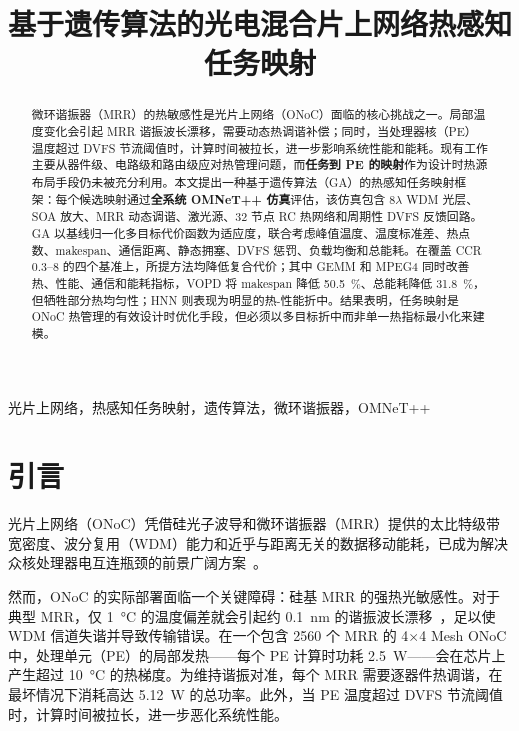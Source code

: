 \documentclass[conference]{IEEEtran}
\begin{document}
\title{基于遗传算法的光电混合片上网络热感知任务映射}

\author{
}

\maketitle

\begin{abstract}
微环谐振器（MRR）的热敏感性是光片上网络（ONoC）面临的核心挑战之一。局部温度变化会引起 MRR 谐振波长漂移，需要动态热调谐补偿；同时，当处理器核（PE）温度超过 DVFS 节流阈值时，计算时间被拉长，进一步影响系统性能和能耗。现有工作主要从器件级、电路级和路由级应对热管理问题，而\textbf{任务到 PE 的映射}作为设计时热源布局手段仍未被充分利用。本文提出一种基于遗传算法（GA）的热感知任务映射框架：每个候选映射通过\textbf{全系统 OMNeT++ 仿真}评估，该仿真包含 8$\lambda$ WDM 光层、SOA 放大、MRR 动态调谐、激光源、32 节点 RC 热网络和周期性 DVFS 反馈回路。GA 以基线归一化多目标代价函数为适应度，联合考虑峰值温度、温度标准差、热点数、makespan、通信距离、静态拥塞、DVFS 惩罚、负载均衡和总能耗。在覆盖 CCR 0.3--8 的四个基准上，所提方法均降低复合代价；其中 GEMM 和 MPEG4 同时改善热、性能、通信和能耗指标，VOPD 将 makespan 降低 \SI{50.5}{\percent}、总能耗降低 \SI{31.8}{\percent}，但牺牲部分热均匀性；HNN 则表现为明显的热-性能折中。结果表明，任务映射是 ONoC 热管理的有效设计时优化手段，但必须以多目标折中而非单一热指标最小化来建模。
\end{abstract}

\begin{IEEEkeywords}
光片上网络，热感知任务映射，遗传算法，微环谐振器，OMNeT++
\end{IEEEkeywords}

\section{引言}

光片上网络（ONoC）凭借硅光子波导和微环谐振器（MRR）提供的太比特级带宽密度、波分复用（WDM）能力和近乎与距离无关的数据移动能耗，已成为解决众核处理器电互连瓶颈的前景广阔方案~\cite{batten2008,bergman2018}。

然而，ONoC 的实际部署面临一个关键障碍：硅基 MRR 的强热光敏感性。对于典型 MRR，仅 \SI{1}{\degreeCelsius} 的温度偏差就会引起约 \SI{0.1}{\nano\meter} 的谐振波长漂移~\cite{padmaraju2014}，足以使 WDM 信道失谐并导致传输错误。在一个包含 2560 个 MRR 的 4$\times$4 Mesh ONoC 中，处理单元（PE）的局部发热——每个 PE 计算时功耗 \SI{2.5}{\watt}——会在芯片上产生超过 \SI{10}{\degreeCelsius} 的热梯度。为维持谐振对准，每个 MRR 需要逐器件热调谐，在最坏情况下消耗高达 \SI{5.12}{\watt} 的总功率。此外，当 PE 温度超过 DVFS 节流阈值时，计算时间被拉长，进一步恶化系统性能。
\end{document}
